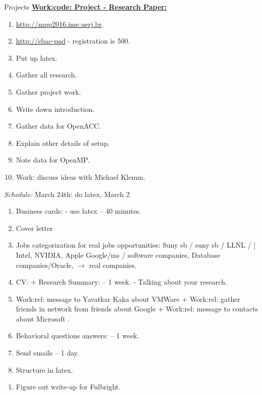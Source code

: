 \begin{block}{Projects}
{\underline{\bf Work:code: Project - Research Paper:}}
\begin{enumerate}
\tiny \item \tiny \url{http://mpp2016.ime.uerj.br}. 
\item \tiny \url{http://sbac-pad}  - registration is  500.
\item \tiny Put up latex.  
\item \tiny Gather all research. 
\item \tiny Gather project work. 
\item \tiny Write down introduction.
\item \tiny Gather data for OpenACC. 
\item \tiny Explain other details of setup. 
\item \tiny Note data for OpenMP. 
\item \tiny Work: discuss ideas with Michael Klemm. 
\end{enumerate} 
\textit{Schedule:} March 24th: do latex, March 2 \\
\begin{enumerate} 
\tiny \item \tiny Business cards:  - use latex  -- 40 minutes. 
\item \tiny Cover letter 
\item \tiny Jobs categorization for real jobs opportunities: 
Suny sb / suny sb / LLNL /  |  Intel, NVIDIA, Apple  Google/ms /
software companies, Database companies/Oracle, $\rightarrow$ real
companies. 
\item \tiny CV: + Research Summary:  -- 1 week.  - Talking about your research.
\item \tiny Work:rel: message to Yavatkar Kaka about VMWare +
  Work:rel: gather friends in network from friends about Google + Work:rel: message to contacts about Microsoft \te{} \dl{} \pr{}. 
\item \tiny Behavioral questions answers:    -- 1 week. 
\item \tiny Send emails – 1 day. 
\item \tiny Structure in latex. 
\end{enumerate}
\begin{enumerate} 
\tiny \item \tiny Figure out write-up for Fulbright. 

\end{enumerate}
\end{block}
